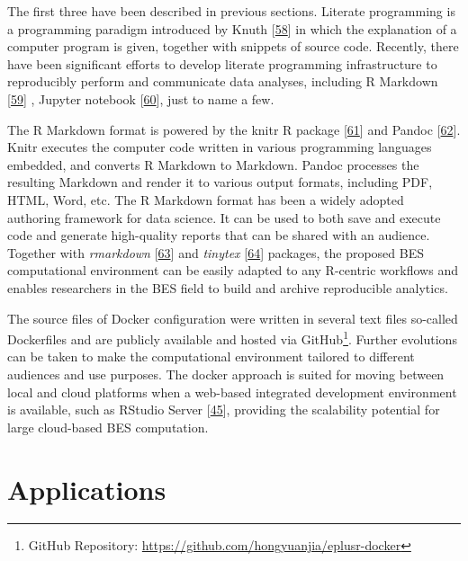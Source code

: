\documentclass[3p, times]{elsarticle} %
\begin{document}
The first three have been described in previous sections. Literate programming
is a programming paradigm introduced by Knuth {[}\protect\hyperlink{ref-Knuth1984}{58}{]} in which the
explanation of a computer program is given, together with snippets of source
code. Recently, there have been significant efforts to develop literate
programming infrastructure to reproducibly perform and communicate data
analyses, including R Markdown {[}\protect\hyperlink{ref-Grolemund2018}{59}{]} , Jupyter notebook
{[}\protect\hyperlink{ref-Kluyver2016}{60}{]}, just to name a few.

The R Markdown format is powered by the knitr R package {[}\protect\hyperlink{ref-Xie2015}{61}{]} and Pandoc
{[}\protect\hyperlink{ref-Krewinkel2017}{62}{]}. Knitr executes the computer code written in various
programming languages embedded, and converts R Markdown to Markdown. Pandoc
processes the resulting Markdown and render it to various output formats,
including PDF, HTML, Word, etc. The R Markdown format has been a widely adopted
authoring framework for data science. It can be used to both save and execute
code and generate high-quality reports that can be shared with an audience.
Together with \emph{rmarkdown} {[}\protect\hyperlink{ref-Allaire2020}{63}{]} and \emph{tinytex} {[}\protect\hyperlink{ref-Xie2019}{64}{]} packages, the
proposed BES computational environment can be easily adapted to any R-centric
workflows and enables researchers in the BES field to build and archive
reproducible analytics.

The source files of Docker configuration were written in several text files
so-called Dockerfiles and are publicly available and hosted via GitHub\footnote{GitHub Repository: \url{https://github.com/hongyuanjia/eplusr-docker}}.
Further evolutions can be taken to make the computational environment tailored
to different audiences and use purposes. The docker approach is suited for
moving between local and cloud platforms when a web-based integrated development
environment is available, such as RStudio Server {[}\protect\hyperlink{ref-Boettiger2015}{45}{]}, providing the
scalability potential for large cloud-based BES computation.

\hypertarget{sec:applications}{%
\section{Applications}\label{sec:applications}}
\end{document}
